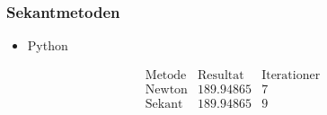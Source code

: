 \begin{frame}
\frametitle{Sekantmetoden}
\begin{itemize}
\item Python
\end{itemize}
$$\begin{array}{l|c|c}
\text{Metode} & \text{Resultat} & \text{Iterationer}\\
\hline
\text{Newton}		& 189.94865 & 7\\
\text{Sekant}		& 189.94865 & 9
\end{array}$$
\end{frame}